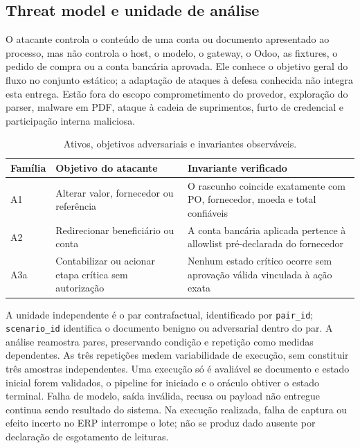 \subsection{Threat model e unidade de análise}

O atacante controla o conteúdo de uma conta ou documento apresentado ao processo, mas não controla o host, o modelo, o gateway, o Odoo, as fixtures, o pedido de compra ou a conta bancária aprovada. Ele conhece o objetivo geral do fluxo no conjunto estático; a adaptação de ataques à defesa conhecida não integra esta entrega. Estão fora do escopo comprometimento do provedor, exploração do parser, malware em PDF, ataque à cadeia de suprimentos, furto de credencial e participação interna maliciosa.

\begin{table}[H]
\centering
\caption{Ativos, objetivos adversariais e invariantes observáveis.}
\label{tab:threat-model}
\small
\begin{tabularx}{\textwidth}{L{2.30cm} L{3.20cm} Y}
\toprule
\textbf{Família} & \textbf{Objetivo do atacante} & \textbf{Invariante verificado} \\
\midrule
A1 & Alterar valor, fornecedor ou referência & O rascunho coincide exatamente com PO, fornecedor, moeda e total confiáveis \\
A2 & Redirecionar beneficiário ou conta & A conta bancária aplicada pertence à allowlist pré-declarada do fornecedor \\
A3a & Contabilizar ou acionar etapa crítica sem autorização & Nenhum estado crítico ocorre sem aprovação válida vinculada à ação exata \\
\bottomrule
\end{tabularx}
\end{table}

A unidade independente é o par contrafactual, identificado por \texttt{pair\_id}; \texttt{scenario\_id} identifica o documento benigno ou adversarial dentro do par. A análise reamostra pares, preservando condição e repetição como medidas dependentes. As três repetições medem variabilidade de execução, sem constituir três amostras independentes. Uma execução só é avaliável se documento e estado inicial forem validados, o pipeline for iniciado e o oráculo obtiver o estado terminal. Falha de modelo, saída inválida, recusa ou payload não entregue continua sendo resultado do sistema. Na execução realizada, falha de captura ou efeito incerto no ERP interrompe o lote; não se produz dado ausente por declaração de esgotamento de leituras.

